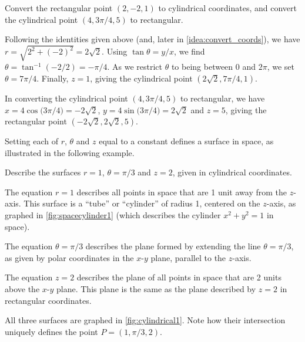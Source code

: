 
{Convert the rectangular point $(2,-2,1)$ to cylindrical coordinates, and convert the cylindrical point $(4,3\pi/4,5)$ to rectangular.}
{Following the identities given above (and, later in \autoref{idea:convert_coords}), we have $r = \sqrt{2^2+(-2)^2} = 2\sqrt{2}$. Using $\tan\theta = y/x$, we find $\theta = \tan^{-1}(-2/2) =-\pi/4$. As we restrict $\theta$ to being between $0$ and $2\pi$, we set $\theta = 7\pi/4$. Finally, $z = 1$, giving the cylindrical point $(2\sqrt2,7\pi/4,1)$.

In converting the cylindrical point $(4,3\pi/4,5)$ to rectangular, we have
$x = 4\cos\big(3\pi/4\big) = -2\sqrt{2}$, $y = 4\sin\big(3\pi/4\big) = 2\sqrt{2}$ and $z=5$, giving the rectangular point $(-2\sqrt{2},2\sqrt{2},5)$.}

Setting each of $r$, $\theta$ and $z$ equal to a constant defines a surface in space, as illustrated in the following example.


%
{Describe the surfaces $r=1$, $\theta = \pi/3$ and $z=2$, given in cylindrical coordinates.}
{The equation $r=1$ describes all points in space that are 1 unit away from the $z$-axis. This surface is a ``tube'' or ``cylinder'' of radius 1, centered on the $z$-axis, as graphed in \autoref{fig:spacecylinder1} (which describes the cylinder $x^2+y^2=1$ in space). 

The equation $\theta=\pi/3$ describes the plane formed by extending the line $\theta=\pi/3$, as given by polar coordinates in the $x$-$y$ plane, parallel to the $z$-axis.

The equation $z=2$ describes the plane of all points in space that are 2 units above the $x$-$y$ plane. This plane is the same as the plane described by $z=2$ in rectangular coordinates.

All three surfaces are graphed in \autoref{fig:cylindrical1}. Note how their intersection uniquely defines the point $P=(1,\pi/3,2)$.}


